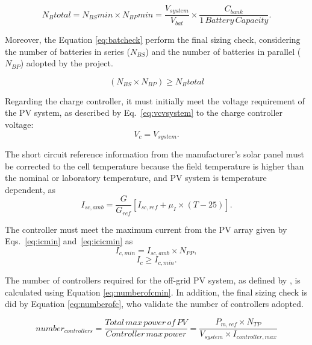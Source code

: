 \begin{equation}
\label{eq:Nbtotal}
N_{B}total = N_{BS}min \times N_{BP}min = \dfrac{V_{system}}{V_{bat}} \times \dfrac{C_{bank}}{1 \,Battery \, Capacity}.
\end{equation}

Moreover, the Equation \ref{eq:batcheck} perform the final sizing check, considering the number of batteries in series ($ N_{BS} $) and the number of batteries in parallel ($ N_{BP} $) adopted by the project.

\begin{equation}
\label{eq:batcheck}
\left( N_{BS} \times  N_{BP} \right) \geq N_{B}total
\end{equation}

Regarding the charge controller, it must initially meet the voltage requirement of the PV system, as described by Eq.~\eqref{eq:vcvsystem} to the charge controller voltage: 
\begin{equation}
\label{eq:vcvsystem}
V_{c} = V_{system}.
\end{equation}

The short circuit reference information from the manufacturer's solar panel must be corrected 
to the cell temperature because the field temperature is higher than the nominal or laboratory temperature, 
and PV system is temperature dependent, as 
%
\begin{equation}
\label{eq:iscamb}
I_{sc,amb} = \dfrac{G}{G_{ref}} \left[ I_{sc,ref} + \mu_{I} \times (T-25) \right]. 
\end{equation}

The controller must meet the maximum current from the PV array given by Eqs.~\eqref{eq:icmin} and~\eqref{eq:icicmin} as
%
\begin{equation}
\label{eq:icmin}
I_{c,min} = I_{sc,amb} \times N_{PP},
\end{equation}
%
\begin{equation}
\label{eq:icicmin}
I_{c} \geq I_{c,min}.
\end{equation}

The number of controllers required for the off-grid PV system, as defined by \cite{Yatimi}, is calculated using Equation \ref{eq:numberofcmin}. In addition, the final sizing check is did by Equation \ref{eq:numberofc}, who validate the number of controllers adopted.

\begin{equation}
\label{eq:numberofcmin}
number_{controllers} = \dfrac{Total \, max \, power \, of \, PV}{Controller \, max \, power} =  \dfrac{P_{m,ref} \times N_{TP}}{V_{system} \times I_{controller,max}}
\end{equation}


